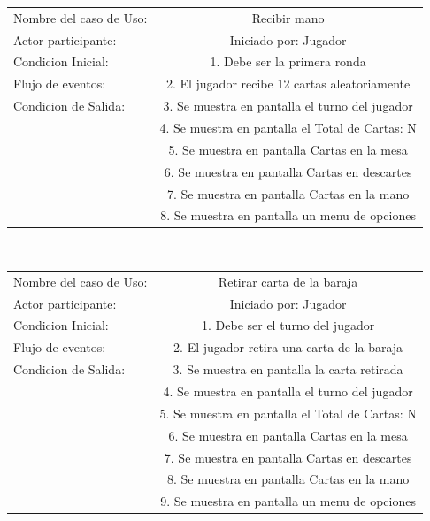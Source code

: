 \begin{center}
    \begin{tabular}{ l | c  }
        Nombre del caso de Uso: & Recibir mano                                    \\
        Actor participante:     & Iniciado por: Jugador                           \\\hline
        Condicion Inicial:      & 1. Debe ser la primera ronda                    \\
        Flujo de eventos:       & 2. El jugador recibe 12 cartas aleatoriamente   \\\hline
        Condicion de Salida:    & 3. Se muestra en pantalla el turno del jugador  \\
                                & 4. Se muestra en pantalla el Total de Cartas: N \\
                                & 5. Se muestra en pantalla Cartas en la mesa     \\
                                & 6. Se muestra en pantalla Cartas en descartes   \\
                                & 7. Se muestra en pantalla Cartas en la mano     \\
                                & 8. Se muestra en pantalla un menu de opciones   \\ 
    \end{tabular} \\
\end{center}
\begin{center}
    \begin{tabular}{ l | c  }
        Nombre del caso de Uso: & Retirar carta de la baraja                      \\
        Actor participante:     & Iniciado por: Jugador                           \\\hline
        Condicion Inicial:      & 1. Debe ser el turno del jugador                \\
        Flujo de eventos:       & 2. El jugador retira una carta de la baraja     \\\hline
        Condicion de Salida:    & 3. Se muestra en pantalla la carta retirada     \\
                                & 4. Se muestra en pantalla el turno del jugador  \\
                                & 5. Se muestra en pantalla el Total de Cartas: N \\
                                & 6. Se muestra en pantalla Cartas en la mesa     \\
                                & 7. Se muestra en pantalla Cartas en descartes   \\
                                & 8. Se muestra en pantalla Cartas en la mano     \\
                                & 9. Se muestra en pantalla un menu de opciones   \\ 
    \end{tabular} \\
\end{center}
